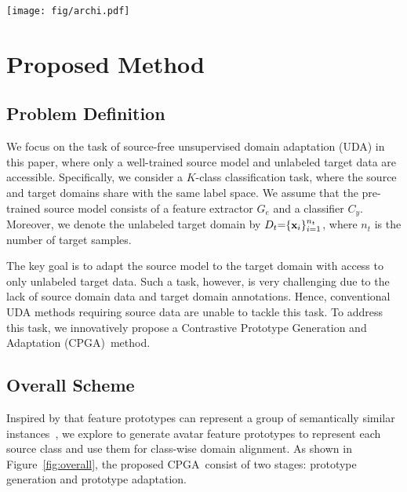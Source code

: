 \documentclass{article}
\def\ournet{CPGA}
\begin{document}
\begin{figure*}[h]
\centering
\texttt{[image: fig/archi.pdf]}
\vspace{-0.07in}
\caption{An overview of \ournet. \ournet~contains two stages: (1) \textbf{Prototype generation}: under the guidance of the fixed classifier, a generator $G_{g}$ is trained to generate avatar feature prototypes via $\mathcal{L}_{ce}$ and $\mathcal{L}_{con}^{p}$. (2) \textbf{Prototype adaptation}:  in each training batch, we use the learned prototype generator to generate one prototype for each class. Based on the generated prototypes and pseudo labels obtained by clustering, we align each pseudo-labeled target feature to the corresponding class prototype by training a domain-invariant feature extractor via $\mathcal{L}_{con}^{w}$, $\mathcal{L}_{elr}$ and $\mathcal{L}_{nc}$. Note that the classifier $C_{y}$ is fixed during the whole training phase.}
\label{fig:overall}
\vspace{-0.05in}
\end{figure*}


\section{Proposed Method}
\subsection{Problem Definition}
We focus on the task of source-free unsupervised domain adaptation (UDA) in this paper, where only a well-trained source model and unlabeled target data are accessible.
Specifically, we consider a $K$-class classification task, where the source and target domains share with the same label space. We assume that the pre-trained source model consists of a feature extractor $G_{e}$ and a classifier $C_{y}$.  Moreover, we denote the unlabeled target domain by $D_t\small{=}\{\textbf{x}_i\}_{i\small{=}1}^{n_t}$, where $n_{t}$ is the number of target samples.

The key goal is to adapt the source model to the target domain with access to only unlabeled target data. Such a task, however, is very challenging due to 
the lack of source domain data and target domain annotations. Hence, conventional UDA methods requiring source data are unable to tackle this task. To address this task, we innovatively propose a Contrastive Prototype Generation and Adaptation (\ournet)~method.



\subsection{Overall Scheme}
Inspired by that feature prototypes can represent a group of semantically similar instances~\cite{snell2017prototypical}, we explore to generate avatar feature prototypes to represent each source class and use them for class-wise domain alignment. 
As shown in Figure~\ref{fig:overall}, the proposed \ournet~consist of two stages: prototype generation and prototype adaptation.
\end{document}
